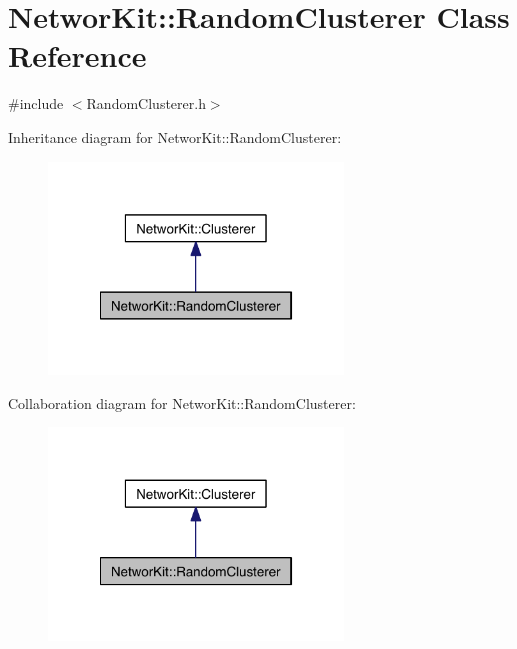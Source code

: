 \hypertarget{class_networ_kit_1_1_random_clusterer}{\section{Networ\-Kit\-:\-:Random\-Clusterer Class Reference}
\label{class_networ_kit_1_1_random_clusterer}
}


{\ttfamily \#include $<$Random\-Clusterer.\-h$>$}



Inheritance diagram for Networ\-Kit\-:\-:Random\-Clusterer\-:\nopagebreak
\begin{figure}[H]
\begin{center}
\leavevmode
\includegraphics[width=222pt]{class_networ_kit_1_1_random_clusterer__inherit__graph}
\end{center}
\end{figure}


Collaboration diagram for Networ\-Kit\-:\-:Random\-Clusterer\-:\nopagebreak
\begin{figure}[H]
\begin{center}
\leavevmode
\includegraphics[width=222pt]{class_networ_kit_1_1_random_clusterer__coll__graph}
\end{center}
\end{figure}
